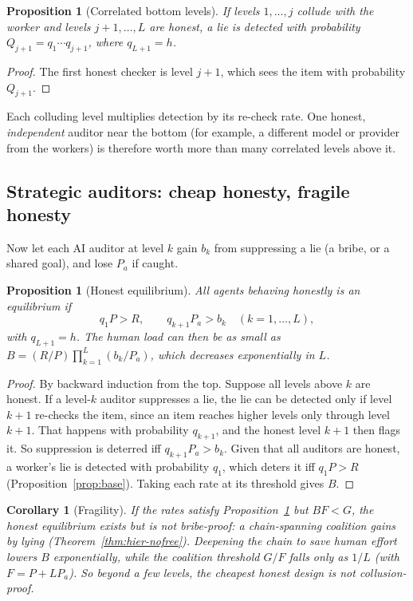 \documentclass[11pt]{article}
\newtheorem{proposition}[theorem]{Proposition}
\newtheorem{corollary}[theorem]{Corollary}
\theoremstyle{definition}
\theoremstyle{remark}
\newcommand{\1}{\mathbf{1}}
\begin{document}
\begin{proposition}[Correlated bottom levels]\label{prop:hier-bottom}
If levels $1,\dots,j$ collude with the worker and levels $j+1,\dots,L$ are honest, a lie is
detected with probability $Q_{j+1}=q_1\cdots q_{j+1}$, where $q_{L+1}=h$.
\end{proposition}

\begin{proof}
The first honest checker is level $j+1$, which sees the item with probability $Q_{j+1}$.
\end{proof}

Each colluding level multiplies detection by its re-check rate. One honest,
\emph{independent} auditor near the bottom (for example, a different model or provider
from the workers) is therefore worth more than many correlated levels above it.

\subsection{Strategic auditors: cheap honesty, fragile honesty}

Now let each AI auditor at level $k$ gain $b_k$ from suppressing a lie (a bribe, or a
shared goal), and lose $P_a$ if caught.

\begin{proposition}[Honest equilibrium]\label{prop:hier-ic}
All agents behaving honestly is an equilibrium if
\[
q_1P>R,\qquad q_{k+1}P_a>b_k\quad(k=1,\dots,L),
\]
with $q_{L+1}=h$. The human load can then be as small as
$B=(R/P)\prod_{k=1}^{L}(b_k/P_a)$, which decreases exponentially in $L$.
\end{proposition}

\begin{proof}
By backward induction from the top. Suppose all levels above $k$ are honest. If a level-$k$
auditor suppresses a lie, the lie can be detected only if level $k+1$ re-checks the item,
since an item reaches higher levels only through level $k+1$. That happens with
probability $q_{k+1}$, and the honest level $k+1$ then flags it. So suppression is
deterred iff $q_{k+1}P_a>b_k$. Given that all auditors are honest, a worker's lie is
detected with probability $q_1$, which deters it iff $q_1P>R$
(Proposition~\ref{prop:base}). Taking each rate at its threshold gives $B$.
\end{proof}

\begin{corollary}[Fragility]\label{cor:hier-fragile}
If the rates satisfy Proposition~\ref{prop:hier-ic} but $BF<G$, the honest equilibrium
exists but is not bribe-proof: a chain-spanning coalition gains by lying
(Theorem~\ref{thm:hier-nofree}). Deepening the chain to save human effort lowers $B$
exponentially, while the coalition threshold $G/F$ falls only as $1/L$ (with $F=P+LP_a$).
So beyond a few levels, the cheapest honest design is not collusion-proof.
\end{corollary}
\end{document}
